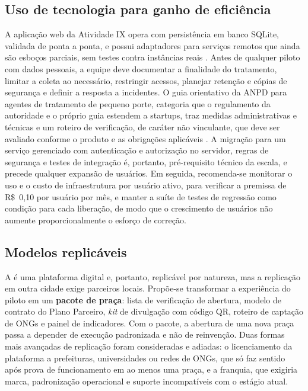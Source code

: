 \subsection{Uso de tecnologia para ganho de eficiência}

A aplicação web da Atividade IX opera com persistência em banco SQLite, validada de ponta a ponta, e possui adaptadores para serviços remotos que ainda são esboços parciais, sem testes contra instâncias reais \cite{cassino2026repo}. Antes de qualquer piloto com dados pessoais, a equipe deve documentar a finalidade do tratamento, limitar a coleta ao necessário, restringir acessos, planejar retenção e cópias de segurança e definir a resposta a incidentes. O guia orientativo da ANPD para agentes de tratamento de pequeno porte, categoria que o regulamento da autoridade e o próprio guia estendem a startups, traz medidas administrativas e técnicas e um roteiro de verificação, de caráter não vinculante, que deve ser avaliado conforme o produto e as obrigações aplicáveis \cite{anpd2021guia,anpd2022res2}. A migração para um serviço gerenciado com autenticação e autorização no servidor, regras de segurança e testes de integração é, portanto, pré-requisito técnico da escala, e precede qualquer expansão de usuários. Em seguida, recomenda-se monitorar o uso e o custo de infraestrutura por usuário ativo, para verificar a premissa de R\$~0,10 por usuário por mês, e manter a suíte de testes de regressão como condição para cada liberação, de modo que o crescimento de usuários não aumente proporcionalmente o esforço de correção.

\subsection{Modelos replicáveis}

A \projeto{} é uma plataforma digital e, portanto, replicável por natureza, mas a replicação em outra cidade exige parceiros locais. Propõe-se transformar a experiência do piloto em um \textbf{pacote de praça}: lista de verificação de abertura, modelo de contrato do Plano Parceiro, \textit{kit} de divulgação com código QR, roteiro de captação de ONGs e painel de indicadores. Com o pacote, a abertura de uma nova praça passa a depender de execução padronizada e não de reinvenção. Duas formas mais avançadas de replicação foram consideradas e adiadas: o licenciamento da plataforma a prefeituras, universidades ou redes de ONGs, que só faz sentido após prova de funcionamento em ao menos uma praça, e a franquia, que exigiria marca, padronização operacional e suporte incompatíveis com o estágio atual.

